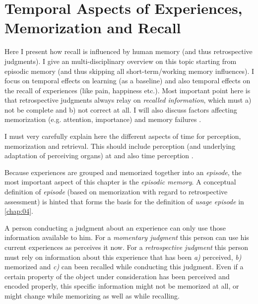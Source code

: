 \chapter{Temporal Aspects of Experiences, Memorization and Recall}\label{chap:03}
\begin{chapter-abstract}
Here I present how recall is influenced by human memory (and thus retrospective judgments).
I give an multi-disciplinary overview on this topic starting from episodic memory (and thus skipping all short-term/working memory influences).
I focus on temporal effects on learning (as a baseline) and also temporal effects on the recall of experiences (like pain, happiness etc.).
Most important point here is that retrospective judgments always relay on \textit{recalled information}, which must a) not be complete and b) not correct at all.
I will also discuss factors affecting memorization (e.g. attention, importance) and memory failures \citep{schacter_seven_2002}.

I must very carefully explain here the different aspects of time for perception, memorization and retrieval.
This should include perception (and underlying adaptation of perceiving organs) at and also time perception \cite{wittmann_neuropsychologie_2009}.


Because experiences are grouped and memorized together into an \emph{episode}, the most important aspect of this chapter is the \emph{episodic memory}.
A conceptual definition of \emph{episode} (based on memorization with regard to retrospective assessment) is hinted that forms the basis for the definition of \emph{usage episode} in \autoref{chap:04}.
\end{chapter-abstract}

A person conducting a judgment about an experience can only use those information available to him.
For a \emph{momentary judgment} this person can use his current experiences as perceives it now.
For a \emph{retrospective judgment} this person must rely on information about this experience that has been \emph{a)} perceived, \emph{b)} memorized and \emph{c)} can been recalled while conducting this judgment.
Even if a certain property of the object under consideration has been perceived and encoded properly, this specific information might not be memorized at all, or might change while memorizing as well as while recalling.

